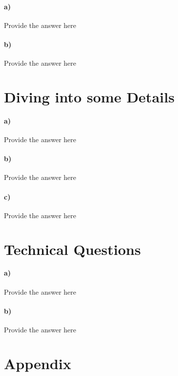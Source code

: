 \documentclass[12pt]{report}
\renewcommand*{\thesection}{Q\arabic{section}}
\begin{document}
\paragraph{a)} \textlangle Provide the answer here\textrangle
\paragraph{b)} \textlangle Provide the answer here\textrangle

\section{Diving into some Details}
\paragraph{a)} \textlangle Provide the answer here\textrangle
\paragraph{b)} \textlangle Provide the answer here\textrangle
\paragraph{c)} \textlangle Provide the answer here\textrangle

\section{Technical Questions}
\paragraph{a)} \textlangle Provide the answer here\textrangle
\paragraph{b)} \textlangle Provide the answer here\textrangle

\newpage
\renewcommand*{\thesection}{}
\section{Appendix}
\end{document}
